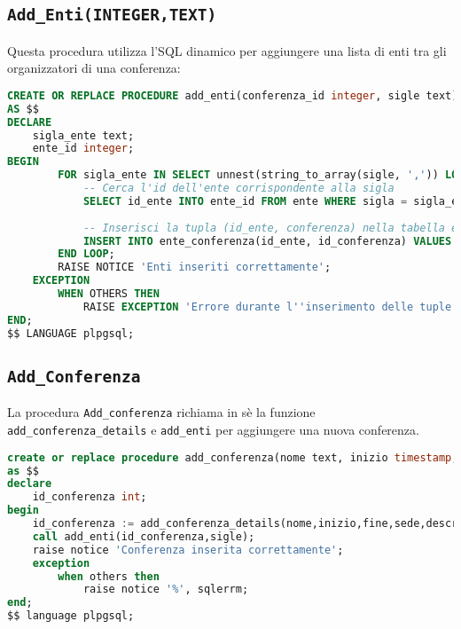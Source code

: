 \subsection{\texttt{Add\_Enti(INTEGER,TEXT)}}
Questa procedura utilizza l'SQL dinamico per aggiungere una lista di enti tra gli organizzatori di una conferenza:
\begin{lstlisting}[language=SQL,style=mystyle]
CREATE OR REPLACE PROCEDURE add_enti(conferenza_id integer, sigle text)
AS $$
DECLARE
    sigla_ente text;
    ente_id integer;
BEGIN
        FOR sigla_ente IN SELECT unnest(string_to_array(sigle, ',')) LOOP
            -- Cerca l'id dell'ente corrispondente alla sigla
            SELECT id_ente INTO ente_id FROM ente WHERE sigla = sigla_ente;
            
            -- Inserisci la tupla (id_ente, conferenza) nella tabella ente_conferenza
            INSERT INTO ente_conferenza(id_ente, id_conferenza) VALUES (ente_id, conferenza_id);
        END LOOP;
        RAISE NOTICE 'Enti inseriti correttamente';
    EXCEPTION
        WHEN OTHERS THEN
            RAISE EXCEPTION 'Errore durante l''inserimento delle tuple nella tabella ente_conferenza: %', SQLERRM;
END;
$$ LANGUAGE plpgsql;
\end{lstlisting}
\subsection{\texttt{Add\_Conferenza}}
La procedura \texttt{Add\_conferenza} richiama in sè la funzione \texttt{add\_conferenza\_details} e \texttt{add\_enti} per aggiungere una nuova conferenza.
\begin{lstlisting}[language=SQL,style=mystyle]
create or replace procedure add_conferenza(nome text, inizio timestamp, fine timestamp, sede integer, descrizione text, sigle text, utente integer)
as $$
declare
    id_conferenza int;
begin
    id_conferenza := add_conferenza_details(nome,inizio,fine,sede,descrizione,utente);
    call add_enti(id_conferenza,sigle);
    raise notice 'Conferenza inserita correttamente';
    exception
        when others then
            raise notice '%', sqlerrm;
end;
$$ language plpgsql;
\end{lstlisting}

